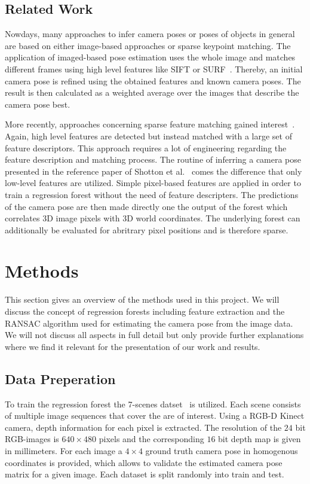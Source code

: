 \documentclass[final]{cvpr}
\begin{document}
\subsection{Related Work}
Nowdays, many approaches to infer camera poses or poses of objects in general are based on either image-based approaches or 
sparse keypoint matching. The application of imaged-based pose estimation uses the whole image and matches different frames 
using high level features like \ac{SIFT} or \ac{SURF}~\cite{Klein2008}. Thereby, an initial camera pose is refined using 
the obtained features and known camera poses. The result is then calculated as a weighted average over the 
images that describe the camera pose best. 

More recently, approaches concerning sparse feature matching gained interest~\cite{Holzer2012}. Again, high level features are detected but 
instead matched with a large set of feature descriptors. This approach requires a lot of engineering regarding the feature
description and matching process. The routine of inferring a camera pose presented in the reference paper of Shotton et al.~\cite{shotton2013}
comes the difference that only low-level features are utilized. Simple pixel-based features are applied in order to train a
regression forest without the need of feature descripters. The predictions of the camera pose are then made directly one the
output of the forest which correlates 3D image pixels with 3D world coordinates. The underlying forest can additionally be 
evaluated for abritrary pixel positions and is therefore sparse.


\section{Methods}
This section gives an overview of the methods used in this project. We will discuss
the concept of regression forests including feature extraction and the RANSAC algorithm
used for estimating the camera pose from the image data. We will not discuss all aspects
in full detail but only provide further explanations where we find it relevant
for the presentation of our work and results.

\subsection{Data Preperation}
To train the regression forest the 7-scenes datset~\cite{glocker2013} is utilized. 
Each scene consists of multiple image sequences that cover the are of interest. Using a RGB-D 
Kinect camera, depth information for each pixel is extracted. The resolution of the $24$ 
bit RGB-images is $640\times480$ pixels and the corresponding $16$ bit depth map is given 
in millimeters. For each image a $4\times4$ ground truth camera pose in homogenous coordinates 
is provided, which allows to validate the estimated camera pose matrix for a given image. 
Each dataset is split randomly into train and test. 
\end{document}
